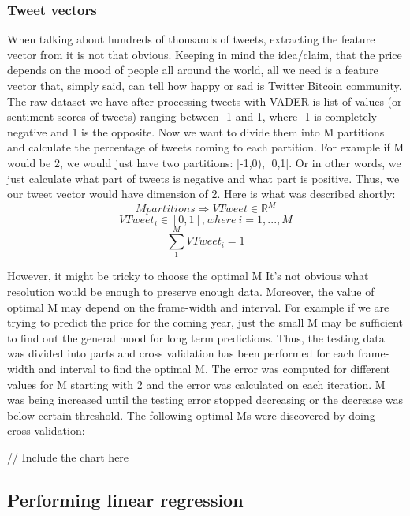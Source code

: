 \documentclass[a4paper,11pt,oneside]{article}
\begin{document}
  \subsubsection{Tweet vectors}
  
  When talking about hundreds of thousands of tweets, extracting the feature vector from it is not that obvious. Keeping in mind the idea/claim, that the price depends on the mood of people all around the world, all we need is a feature vector that, simply said, can tell how happy or sad is Twitter Bitcoin community. The raw dataset we have after processing tweets with VADER is list of values (or sentiment scores of tweets) ranging between -1 and 1, where -1 is completely negative and 1 is the opposite. Now we want to divide them into M partitions and calculate the percentage of tweets coming to each partition. For example if M would be 2, we would just have two partitions: [-1,0), [0,1]. Or in other words, we just calculate what part of tweets is negative and what part is positive. Thus, we our tweet vector would have dimension of 2. Here is what was described shortly:
  \begin{equation}
	  M partitions \Rightarrow VTweet \in \mathbb{R}^M 
  \end{equation}
  \begin{equation}
	  VTweet_i \in [0, 1], where\ i = 1,..., M
  \end{equation}
  \begin{equation}
	  \sum_{1}^{M} VTweet_i = 1
  \end{equation}
	  
  However, it might be tricky to choose the optimal M It’s not obvious what resolution would be enough to preserve enough data. Moreover, the value of optimal M may depend on the frame-width and interval. For example if we are trying to predict the price for the coming year, just the small M may be sufficient to find out the general mood for long term predictions. Thus, the testing data was divided into parts and cross validation has been performed for each frame-width and interval to find the optimal M. The error was computed for different values for M starting with 2 and the error was calculated on each iteration. M was being increased until the testing error stopped decreasing or the decrease was below certain threshold. The following optimal Ms were discovered by doing cross-validation:
  
  // Include the chart here
  
  \subsection{Performing linear regression}
  
\end{document}
